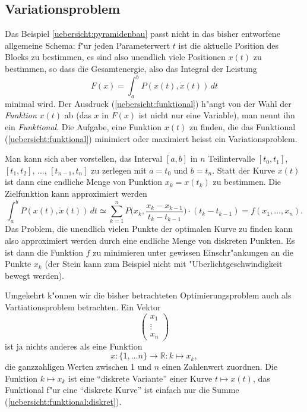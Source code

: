 \subsection{Variationsproblem}
Das Beispiel \ref{uebersicht:pyramidenbau} passt nicht in das bisher
entworfene allgemeine Schema: f"ur jeden
Parameterwert $t$ ist die aktuelle Position des Blocks zu bestimmen,
es sind also unendlich viele Positionen $x(t)$ zu bestimmen, so 
dass die Gesamtenergie, also das Integral der Leistung
\begin{equation}
F(x)=
\int_{a}^{b}P(x(t),\dot x(t))\,dt
\label{uebersicht:funktional}
\end{equation}
minimal wird.
Der Ausdruck (\ref{uebersicht:funktional}) h"angt von der Wahl der
{\em Funktion} $x(t)$ ab (das $x$ in $F(x)$ ist nicht nur eine
Variable), man nennt ihn ein {\em Funktional}.
Die Aufgabe, eine Funktion $x(t)$ zu finden, die das Funktional
(\ref{uebersicht:funktional}) minimiert oder maximiert heisst
ein Variationsproblem.

Man kann sich aber vorstellen, das Interval
$[a,b]$ in $n$ Teilintervalle
$[t_0,t_1]$, $[t_1,t_2]$, $\dots$, $[t_{n-1},t_n]$ zu
zerlegen mit $a=t_0$ und $b=t_n$. Statt der Kurve
$x(t)$ ist dann eine endliche Menge von Punktion $x_k=x(t_k)$ 
zu bestimmen. Die Zielfunktion kann approximiert werden
\begin{equation}
\int_{a}^{b}P(x(t),\dot x(t))\,dt
\simeq
\sum_{k=1}^n P\biggl(x_k,\frac{x_k-x_{k-1}}{t_k-t_{k-1}}\biggr)\cdot (t_k-t_{k-1})
=f(x_1,\dots,x_n).
\label{uebersicht:funktional:diskret}
\end{equation}
Das Problem, die unendlich vielen Punkte der optimalen Kurve
zu finden kann also approximiert werden durch eine endliche Menge
von diskreten Punkten.
Es ist dann die Funktion $f$ zu minimieren
unter gewissen Einschr"ankungen an die Punkte $x_k$ (der Stein kann
zum Beispiel nicht mit "Uberlichtgeschwindigkeit bewegt werden).


Umgekehrt k"onnen wir die bisher betrachteten Optimierungsproblem auch
als Vartiationsproblem betrachten. Ein Vektor
\[
\begin{pmatrix}
x_1\\\vdots\\ x_n
\end{pmatrix}
\]
ist ja nichts anderes als eine Funktion
\[
x\colon \{1,\dots n\}\to \mathbb R: k\mapsto x_k,
\]
die ganzzahligen Werten zwischen 1 und $n$ einen Zahlenwert
zuordnen.
Die Funktion $k\mapsto x_k$ ist eine ``diskrete Variante'' einer
Kurve $t\mapsto x(t)$, das Funktional f"ur eine ``diskrete Kurve''
ist einfach nur die Summe (\ref{uebersicht:funktional:diskret}).



